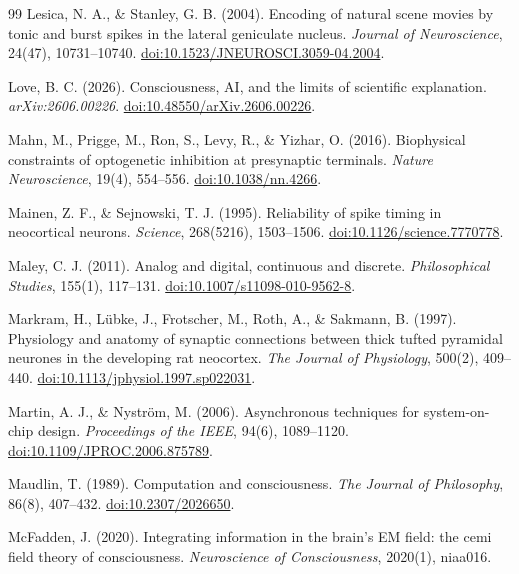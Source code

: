 \begin{thebibliography}{99}
 Lesica, N. A., \& Stanley, G. B. (2004). Encoding of natural scene movies by tonic and burst spikes in the lateral geniculate nucleus. \textit{Journal of Neuroscience}, 24(47), 10731--10740. \href{https://doi.org/10.1523/JNEUROSCI.3059-04.2004}{doi:10.1523/JNEUROSCI.3059-04.2004}.

 Love, B. C. (2026). Consciousness, AI, and the limits of scientific explanation. \textit{arXiv:2606.00226}. \href{https://doi.org/10.48550/arXiv.2606.00226}{doi:10.48550/arXiv.2606.00226}.

 Mahn, M., Prigge, M., Ron, S., Levy, R., \& Yizhar, O. (2016). Biophysical constraints of optogenetic inhibition at presynaptic terminals. \textit{Nature Neuroscience}, 19(4), 554--556. \href{https://doi.org/10.1038/nn.4266}{doi:10.1038/nn.4266}.

 Mainen, Z. F., \& Sejnowski, T. J. (1995). Reliability of spike timing in neocortical neurons. \textit{Science}, 268(5216), 1503--1506. \href{https://doi.org/10.1126/science.7770778}{doi:10.1126/science.7770778}.

 Maley, C. J. (2011). Analog and digital, continuous and discrete. \textit{Philosophical Studies}, 155(1), 117--131. \href{https://doi.org/10.1007/s11098-010-9562-8}{doi:10.1007/s11098-010-9562-8}.

 Markram, H., L\"{u}bke, J., Frotscher, M., Roth, A., \& Sakmann, B. (1997). Physiology and anatomy of synaptic connections between thick tufted pyramidal neurones in the developing rat neocortex. \textit{The Journal of Physiology}, 500(2), 409--440. \href{https://doi.org/10.1113/jphysiol.1997.sp022031}{doi:10.1113/jphysiol.1997.sp022031}.

 Martin, A. J., \& Nystr\"{o}m, M. (2006). Asynchronous techniques for system-on-chip design. \textit{Proceedings of the IEEE}, 94(6), 1089--1120. \href{https://doi.org/10.1109/JPROC.2006.875789}{doi:10.1109/JPROC.2006.875789}.

 Maudlin, T. (1989). Computation and consciousness. \textit{The Journal of Philosophy}, 86(8), 407--432. \href{https://doi.org/10.2307/2026650}{doi:10.2307/2026650}.

 McFadden, J. (2020). Integrating information in the brain's EM field: the cemi field theory of consciousness. \textit{Neuroscience of Consciousness}, 2020(1), niaa016.


\end{thebibliography}
